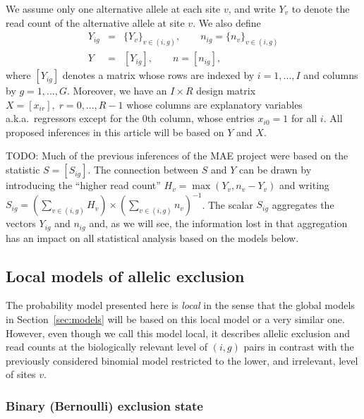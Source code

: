 \documentclass[letterpaper]{article}
\begin{document}
We assume only one alternative allele at each site \(v\), and write \(Y_v\) to
denote the read count of the alternative allele at site \(v\).  We also define 
\begin{eqnarray}
\label{eq:Y-ig-def}
Y_{ig} &=&  \{Y_v\}_{v\in(i,g)}, \qquad n_{ig} = \{n_v\}_{v\in(i,g)} \\
\label{eq:Y-def}
Y &=&  [Y_{ig}], \qquad n = [n_{ig}],
\end{eqnarray}
where \([Y_{ig}]\) denotes a matrix whose rows are indexed by \(i=1,...,I\)
and columns by \(g=1,...,G\).  Moreover, we have an \(I\times R\) design matrix \(X =
[x_{ir}], \; r=0,...,R-1\) whose columns are explanatory variables
a.k.a.~regressors except for the 0th column, whose entries \(x_{i0}=1\)
for all \(i\). All
proposed inferences in this article will be based on \(Y\) and \(X\).

TODO:
Much of the previous inferences of the MAE project were based on the statistic
\(S = [S_{ig}]\). The connection between \(S\) and \(Y\) can be drawn by
introducing the ``higher read count'' \(H_{v} = \max(Y_v, n_v-Y_v)\) and
writing \(S_{ig} = \left( \sum_{v\in(i,g)} H_v \right) \times \left(
\sum_{v\in(i,g)} n_v \right)^{-1}\).  The scalar \(S_{ig}\) aggregates the
vectors \(Y_{ig}\) and \(n_{ig}\) and, as we will see, the information lost in
that aggregation has an impact on all statistical analysis based on the models
below.

\subsection{Local models of allelic exclusion}
\label{sec:local-model}

The probability model presented here is \emph{local} in the sense that the
global models in Section~\ref{sec:models} will be based on this local model or
a very similar one.  However, even though we call this model local, it
describes allelic exclusion and read counts at the biologically relevant level
of \((i,g)\) pairs in contrast with the previously considered binomial model
restricted to the lower, and irrelevant, level of sites \(v\).

\subsubsection{Binary (Bernoulli) exclusion state}
\label{sec:local-binary}
\end{document}
